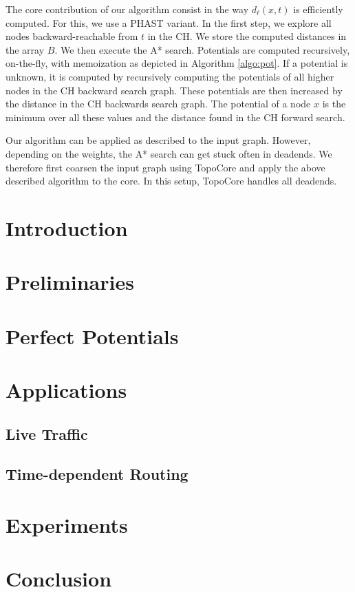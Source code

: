 \documentclass[a4paper,UKenglish,cleveref, autoref]{lipics-v2019}
\begin{document}
The core contribution of our algorithm consist in the way $d_{\ell}(x,t)$ is efficiently computed.
For this, we use a PHAST variant.
In the first step, we explore all nodes backward-reachable from $t$ in the CH.
We store the computed distances in the array $B$.
We then execute the A* search.
Potentials are computed recursively, on-the-fly, with memoization as depicted in Algorithm \ref{algo:pot}.
If a potential is unknown, it is computed by recursively computing the potentials of all higher nodes in the CH backward search graph.
These potentials are then increased by the distance in the CH backwards search graph.
The potential of a node $x$ is the minimum over all these values and the distance found in the CH forward search.

Our algorithm can be applied as described to the input graph.
However, depending on the weights, the A* search can get stuck often in deadends.
We therefore first coarsen the input graph using TopoCore and apply the above described algorithm to the core.
In this setup, TopoCore handles all deadends. 

\section{Introduction}
\label{sec:intro}

\section{Preliminaries}
\label{sec:prelim}

\section{Perfect Potentials}
\label{sec:algo}

\section{Applications}
\label{sec:applications}

\subsection{Live Traffic}
\subsection{Time-dependent Routing}

\section{Experiments}
\label{sec:exp}

\section{Conclusion}
\label{sec:conclusion}





\end{document}
